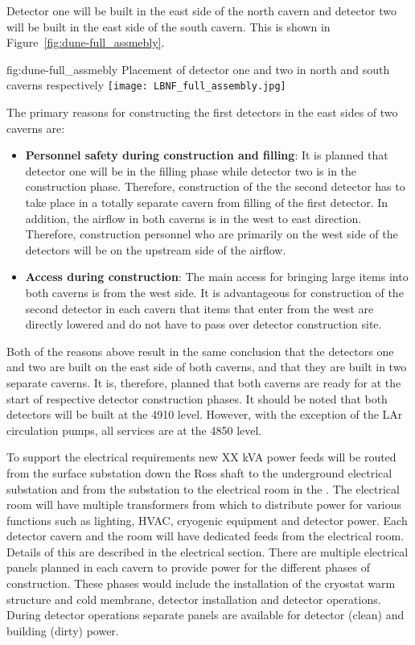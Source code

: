 Detector one will be built in the east side of the north cavern and
detector two will be built in the east side of the south cavern. This
is shown in Figure~\ref{fig:dune-full_assmebly}.
\begin{dunefigure}{fig:dune-full_assmebly}
  {Placement of detector one and two in north and south caverns respectively}
  \texttt{[image: LBNF\_full\_assembly.jpg]}
\end{dunefigure}
The primary reasons for constructing the first detectors in the east
sides of two caverns are:
\begin{itemize}
\item {\bf Personnel safety during construction and filling}: It is
  planned that detector one will be in the filling phase while detector
  two is in the construction phase. Therefore, construction of the the
  second detector has to take place in a totally separate cavern from
  filling of the first detector. In addition, the airflow in both
  caverns is in the west to east direction. Therefore, construction
  personnel who are primarily on the west side of the detectors will
  be on the upstream side of the airflow.
\item{\bf Access during construction}: The main access for bringing
  large items into both caverns is from the west side. It is
  advantageous for construction of the second detector in each cavern
  that items that enter from the west are directly lowered and do not
  have to pass over detector construction site.
\end{itemize}
Both of the reasons above result in the same conclusion that the
detectors one and two are built on the east side of both caverns, and
that they are built in two separate caverns. It is, therefore, planned
that both caverns are ready for  at the start of
respective detector construction phases.  It should be noted that both
detectors will be built at the 4910 level. However, with the exception
of the LAr circulation pumps, all services are at the 4850 level.

To support the electrical requirements new XX kVA power feeds will be
routed from the surface substation down the Ross shaft to the
underground electrical substation and from the substation to the
electrical room in the .  The electrical room will have multiple
transformers from which to distribute power for various functions such
as lighting, HVAC, cryogenic equipment and detector power.  Each
detector cavern and the  room will have dedicated feeds from the
electrical room.  Details of this are described in the electrical
section.  There are multiple electrical panels planned in each cavern
to provide power for the different phases of construction.  These
phases would include the installation of the cryostat warm structure
and cold membrane, detector installation and detector
operations. During detector operations separate panels are available
for detector (clean) and building (dirty) power.

